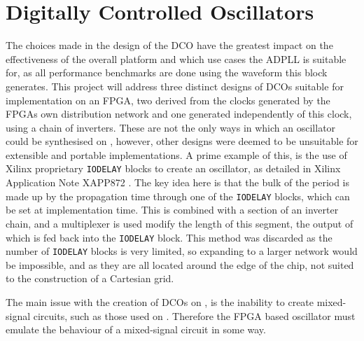 \section{Digitally Controlled Oscillators}
The choices made in the design of the \ac{DCO} have the greatest impact on the effectiveness of the overall platform and which use cases the \ac{ADPLL} is suitable for, as all performance benchmarks are done using the waveform this block generates. This project will address three distinct designs of \acp{DCO} suitable for implementation on an FPGA, two derived from the clocks generated by the \acp{FPGA} own distribution network and one generated independently of this clock, using a chain of inverters. These are not the only ways in which an oscillator could be synthesised on , however, other designs were deemed to be unsuitable for extensible and portable implementations.
A prime example of this, is the use of Xilinx proprietary \texttt{IODELAY} blocks to create an oscillator, as detailed in Xilinx Application Note XAPP872 \cite{iodelay}. The key idea here is that the bulk of the period is made up by the propagation time through one of the \texttt{IODELAY} blocks, which can be set at implementation time. This is combined with a section of an inverter chain, and a multiplexer is used modify the length of this segment, the output of which is fed back into the \texttt{IODELAY} block. This method was discarded as the number of \texttt{IODELAY} blocks is very limited, so expanding to a larger network would be impossible, and as they are all located around the edge of the chip, not suited to the construction of a Cartesian grid.

The main issue with the creation of \acp{DCO} on , is the inability to create mixed-signal circuits, such as those used on . Therefore the \ac{FPGA} based oscillator must emulate the behaviour of a mixed-signal circuit in some way.

